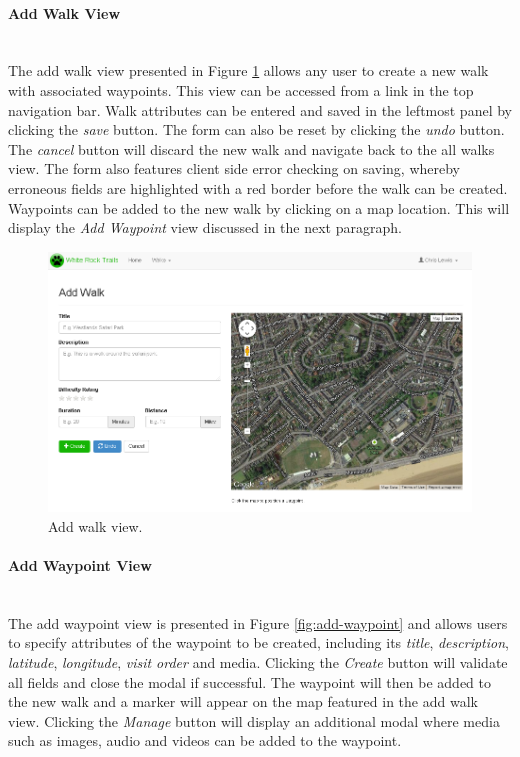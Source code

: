 \documentclass[11pt,a4paper]{report}
\begin{document}
\paragraph{Add Walk View}\mbox{}\\
The add walk view presented in Figure \ref{fig:add-walk} allows any user to create a new walk with associated waypoints. This view can be accessed from a link in the top navigation bar. Walk attributes can be entered and saved in the leftmost panel by clicking the \emph{save} button. The form can also be reset by clicking the \emph{undo} button. The \emph{cancel} button will discard the new walk and navigate back to the all walks view. The form also features client side error checking on saving, whereby erroneous fields are highlighted with a red border before the walk can be created. Waypoints can be added to the new walk by clicking on a map location. This will display the \emph{Add Waypoint} view discussed in the next paragraph.

\begin{figure}[H]
\centering
\includegraphics[width=1\linewidth]{./img/webportal/add-walk}
\caption{Add walk view.}
\label{fig:add-walk}
\end{figure}

\paragraph{Add Waypoint View}\mbox{}\\
The add waypoint view is presented in Figure \ref{fig:add-waypoint} and allows users to specify attributes of the waypoint to be created, including its \emph{title}, \emph{description}, \emph{latitude}, \emph{longitude}, \emph{visit order} and media. Clicking the \emph{Create} button will validate all fields and close the modal if successful. The waypoint will then be added to the new walk and a marker will appear on the map featured in the add walk view. Clicking the \emph{Manage} button will display an additional modal where media such as images, audio and videos can be added to the waypoint.
\end{document}
